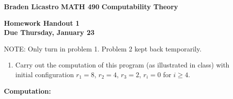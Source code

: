 \documentclass[12pt]{article}
\begin{document}
\textbf{Braden Licastro} \hfill \textbf{MATH 490} \hfill \textbf{Computability Theory}
\vspace{10pt}

\begin{center}
\textbf{Homework Handout 1\\
Due Thursday, January 23}
\end{center}
\vspace{10pt}

\begin{center}
NOTE: Only turn in problem 1. Problem 2 kept back temporarily.
\end{center}

\begin{enumerate}
\item Carry out the computation of this program (as illustrated in class) with initial configuration $r_1=8$, $r_2=4$, $r_3=2$, $r_i=0$ for $i \geq 4$.

\end{enumerate}
\textbf{Computation:}
\end{document}

